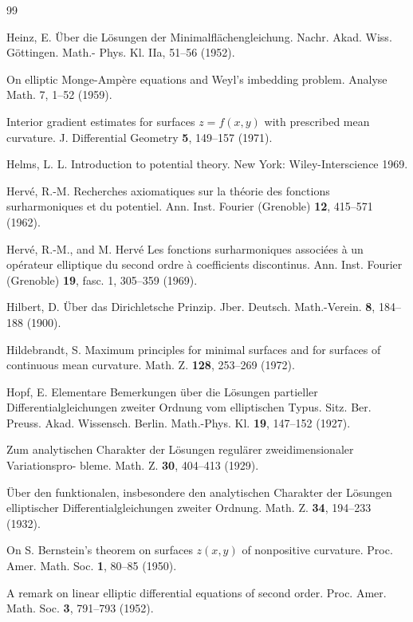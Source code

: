 \begin{thebibliography}{99}

Heinz, E.
Über die Lösungen der Minimalflächengleichung. Nachr. Akad. Wiss. Göttingen. Math.-
Phys. Kl. IIa, 51--56 (1952).

On elliptic Monge-Ampère equations and Weyl's imbedding problem. Analyse Math. 7,
1--52 (1959).

Interior gradient estimates for surfaces $z = f(x, y)$ with prescribed mean curvature. J.
Differential Geometry \textbf{5}, 149--157 (1971).

Helms, L. L.
Introduction to potential theory. New York: Wiley-Interscience 1969.

Hervé, R.-M.
Recherches axiomatiques sur la théorie des fonctions surharmoniques et du potentiel.
Ann. Inst. Fourier (Grenoble) \textbf{12}, 415--571 (1962).

Hervé, R.-M., and M. Hervé
Les fonctions surharmoniques associées à un opérateur elliptique du second ordre à
coefficients discontinus. Ann. Inst. Fourier (Grenoble) \textbf{19}, fasc. 1, 305--359 (1969).

Hilbert, D.
Über das Dirichletsche Prinzip. Jber. Deutsch. Math.-Verein. \textbf{8}, 184--188 (1900).

Hildebrandt, S.
Maximum principles for minimal surfaces and for surfaces of continuous mean curvature.
Math. Z. \textbf{128}, 253--269 (1972).

Hopf, E.
Elementare Bemerkungen über die Lösungen partieller Differentialgleichungen zweiter
Ordnung vom elliptischen Typus. Sitz. Ber. Preuss. Akad. Wissensch. Berlin. Math.-Phys.
Kl. \textbf{19}, 147--152 (1927).

Zum analytischen Charakter der Lösungen regulärer zweidimensionaler Variationspro-
bleme. Math. Z. \textbf{30}, 404--413 (1929).

Über den funktionalen, insbesondere den analytischen Charakter der Lösungen elliptischer
Differentialgleichungen zweiter Ordnung. Math. Z. \textbf{34}, 194--233 (1932).

On S. Bernstein's theorem on surfaces $z(x, y)$ of nonpositive curvature. Proc. Amer. Math.
Soc. \textbf{1}, 80--85 (1950).

A remark on linear elliptic differential equations of second order. Proc. Amer. Math. Soc.
\textbf{3}, 791--793 (1952).


\end{thebibliography}
